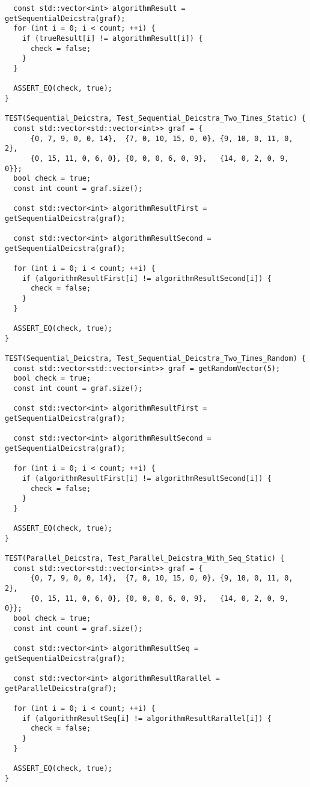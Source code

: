 \documentclass{report}
\begin{document}
\begin{lstlisting}
  const std::vector<int> algorithmResult = getSequentialDeicstra(graf);
  for (int i = 0; i < count; ++i) {
    if (trueResult[i] != algorithmResult[i]) {
      check = false;
    }
  }

  ASSERT_EQ(check, true);
}

TEST(Sequential_Deicstra, Test_Sequential_Deicstra_Two_Times_Static) {
  const std::vector<std::vector<int>> graf = {
      {0, 7, 9, 0, 0, 14},  {7, 0, 10, 15, 0, 0}, {9, 10, 0, 11, 0, 2},
      {0, 15, 11, 0, 6, 0}, {0, 0, 0, 6, 0, 9},   {14, 0, 2, 0, 9, 0}};
  bool check = true;
  const int count = graf.size();

  const std::vector<int> algorithmResultFirst = getSequentialDeicstra(graf);

  const std::vector<int> algorithmResultSecond = getSequentialDeicstra(graf);

  for (int i = 0; i < count; ++i) {
    if (algorithmResultFirst[i] != algorithmResultSecond[i]) {
      check = false;
    }
  }

  ASSERT_EQ(check, true);
}

TEST(Sequential_Deicstra, Test_Sequential_Deicstra_Two_Times_Random) {
  const std::vector<std::vector<int>> graf = getRandomVector(5);
  bool check = true;
  const int count = graf.size();

  const std::vector<int> algorithmResultFirst = getSequentialDeicstra(graf);

  const std::vector<int> algorithmResultSecond = getSequentialDeicstra(graf);

  for (int i = 0; i < count; ++i) {
    if (algorithmResultFirst[i] != algorithmResultSecond[i]) {
      check = false;
    }
  }

  ASSERT_EQ(check, true);
}

TEST(Parallel_Deicstra, Test_Parallel_Deicstra_With_Seq_Static) {
  const std::vector<std::vector<int>> graf = {
      {0, 7, 9, 0, 0, 14},  {7, 0, 10, 15, 0, 0}, {9, 10, 0, 11, 0, 2},
      {0, 15, 11, 0, 6, 0}, {0, 0, 0, 6, 0, 9},   {14, 0, 2, 0, 9, 0}};
  bool check = true;
  const int count = graf.size();

  const std::vector<int> algorithmResultSeq = getSequentialDeicstra(graf);

  const std::vector<int> algorithmResultRarallel = getParallelDeicstra(graf);

  for (int i = 0; i < count; ++i) {
    if (algorithmResultSeq[i] != algorithmResultRarallel[i]) {
      check = false;
    }
  }

  ASSERT_EQ(check, true);
}


\end{lstlisting}
\end{document}
